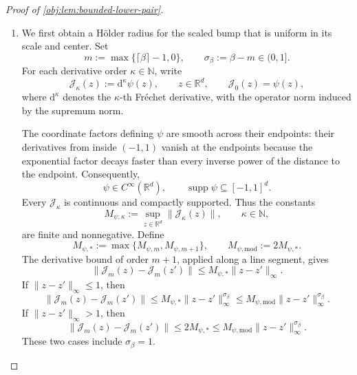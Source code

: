 \begin{proof}[Proof of \cref{obj:lem:bounded-lower-pair}]
\begin{enumerate}
\item We first obtain a Hölder radius for the scaled bump that is uniform in its scale and center. Set
\[
m:=\max\{\lceil\beta\rceil-1,0\},
\qquad
\sigma_\beta:=\beta-m\in(0,1].
\]
For each derivative order \(\kappa\in\mathbb N\), write
\[
\mathscr J_\kappa(z):=\mathrm d^\kappa\psi(z),
\qquad z\in\mathbb R^d,
\qquad
\mathscr J_0(z)=\psi(z),
\]
where \(\mathrm d^\kappa\) denotes the \(\kappa\)-th Fréchet derivative, with the operator norm induced by the supremum norm.

The coordinate factors defining \(\psi\) are smooth across their endpoints: their derivatives from inside \((-1,1)\) vanish at the endpoints because the exponential factor decays faster than every inverse power of the distance to the endpoint. Consequently,
\[
\psi\in C^\infty(\mathbb R^d),
\qquad
\operatorname{supp}\psi\subseteq[-1,1]^d.
\]
Every \(\mathscr J_\kappa\) is continuous and compactly supported. Thus the constants
\[
M_{\psi,\kappa}:=
\sup_{z\in\mathbb R^d}\|\mathscr J_\kappa(z)\|,
\qquad \kappa\in\mathbb N,
\]
are finite and nonnegative. Define
\[
M_{\psi,*}:=\max\{M_{\psi,m},M_{\psi,m+1}\},
\qquad
M_{\psi,\mathrm{mod}}:=2M_{\psi,*}.
\]
The derivative bound of order \(m+1\), applied along a line segment, gives
\[
\|\mathscr J_m(z)-\mathscr J_m(z')\|
\le M_{\psi,*}\|z-z'\|_\infty.
\]
If \(\|z-z'\|_\infty\le1\), then
\[
\|\mathscr J_m(z)-\mathscr J_m(z')\|
\le M_{\psi,*}\|z-z'\|_\infty^{\sigma_\beta}
\le M_{\psi,\mathrm{mod}}\|z-z'\|_\infty^{\sigma_\beta}.
\]
If \(\|z-z'\|_\infty>1\), then
\[
\|\mathscr J_m(z)-\mathscr J_m(z')\|
\le 2M_{\psi,*}
\le M_{\psi,\mathrm{mod}}\|z-z'\|_\infty^{\sigma_\beta}.
\]
These two cases include \(\sigma_\beta=1\).


\end{enumerate}
\end{proof}
